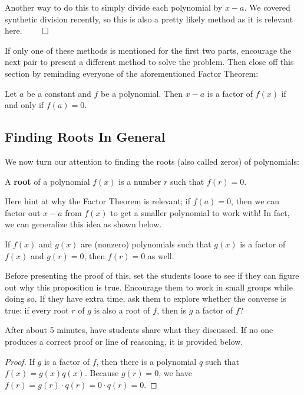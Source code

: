 Another way to do this to simply divide each polynomial by $x-a$. We covered synthetic division recently, so this is also a pretty likely method as it is relevant here. \hspace*{\fill} $\qed$

If only one of these methods is mentioned for the first two parts, encourage the next pair to present a different method to solve the problem. Then close off this section by reminding everyone of the aforementioned Factor Theorem:

\begin{theorem}
    Let $a$ be a constant and $f$ be a polynomial. Then $x-a$ is a factor of $f(x)$ if and only if $f(a) = 0$.
\end{theorem}



\subsection{Finding Roots In General}

We now turn our attention to finding the roots (also called zeros) of polynomials:

\begin{definition}
    A \textbf{root} of a polynomial $f(x)$ is a number $r$ such that $f(r) = 0$.
\end{definition}

Here hint at why the Factor Theorem is relevant; if $f(a) = 0$, then we can factor out $x-a$ from $f(x)$ to get a smaller polynomial to work with! In fact, we can generalize this idea as shown below. 

\begin{proposition}
    If $f(x)$ and $g(x)$ are (nonzero) polynomials such that $g(x)$ is a factor of $f(x)$ and $g(r) = 0$, then $f(r) = 0$ as well.
\end{proposition}

Before presenting the proof of this, set the students loose to see if they can figure out why this proposition is true. Encourage them to work in small groups while doing so. If they have extra time, ask them to explore whether the converse is true: if every root $r$ of $g$ is also a root of $f$, then is $g$ a factor of $f$?

After about 5 minutes, have students share what they discussed. If no one produces a correct proof or line of reasoning, it is provided below.

\begin{proof}
    If $g$ is a factor of $f$, then there is a polynomial $q$ such that $f(x) = g(x) q(x)$. Because $g(r)= 0$, we have $f(r) = g(r)\cdot q(r) = 0\cdot q(r) = 0$.
\end{proof}

